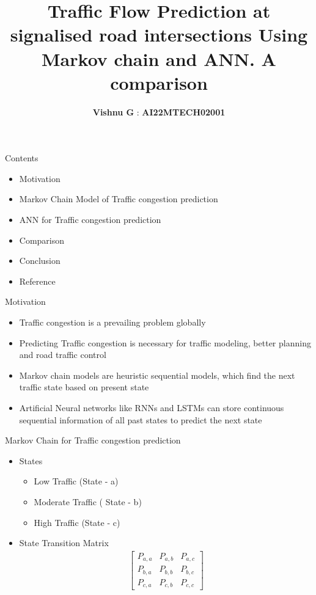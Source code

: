 \documentclass[10pt]{beamer}
\title{Traffic Flow Prediction at signalised road intersections Using Markov chain and ANN. A comparison}
\date{}
\author{\textbf{Vishnu G} :  \textbf{AI22MTECH02001}}
\institute{Indian Institute of Technology Hyderabad}
\begin{document}
\maketitle

\begin{frame}{Contents}
\title{}
\begin{itemize}
 \item Motivation
 \item Markov Chain Model of Traffic congestion prediction
 \item ANN for Traffic congestion prediction
 \item Comparison
 \item Conclusion
 \item Reference
\end{itemize}
\end{frame}

\begin{frame}{Motivation}
\begin{itemize}
    \item Traffic congestion is a prevailing problem globally
    \item Predicting Traffic congestion is necessary for traffic modeling, better planning and road traffic control 
    \item Markov chain models are heuristic sequential models, which find the next traffic state based on present state
    \item Artificial Neural networks like RNNs and LSTMs can store continuous sequential information of all past states to predict the next state
\end{itemize}

\end{frame}

\begin{frame}{Markov Chain for Traffic congestion prediction}
\begin{itemize}
\item States 
\begin{itemize}
\item Low Traffic (State - a)
\item Moderate Traffic ( State - b)
\item High Traffic (State - c)
\end{itemize}
\item{State Transition Matrix}
\begin{align*}
\begin{bmatrix}
    P_{a,a}  &  P_{a,b} &  P_{a,c} \\
    P_{b,a}  &  P_{b,b} &  P_{b,c} \\
    P_{c,a}  &  P_{c,b} &  P_{c,c}
\end{bmatrix}
\end{align*}
\end{itemize}

\end{frame}
\end{document}

